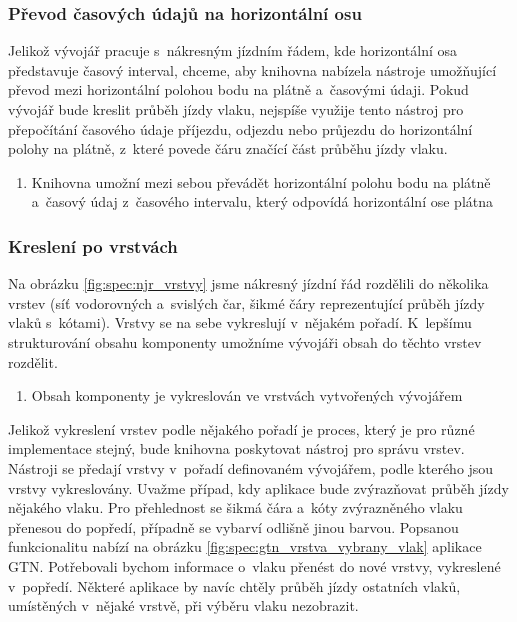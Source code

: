 \subsubsection*{Převod časových údajů na horizontální osu}
Jelikož vývojář pracuje s~nákresným jízdním řádem, kde horizontální osa představuje časový interval, chceme, aby knihovna nabízela nástroje umožňující převod mezi horizontální polohou bodu na plátně a~časovými údaji. Pokud vývojář bude kreslit průběh jízdy vlaku, nejspíše využije tento nástroj pro přepočítání časového údaje příjezdu, odjezdu nebo průjezdu do horizontální polohy na plátně, z~které povede čáru značící část průběhu jízdy vlaku.

\begin{enumerate}[label=\color{reqcolor}\textbf{R{\arabic*}},resume]
	\item \label{spec:req:conv1} Knihovna umožní mezi sebou převádět horizontální polohu bodu na plátně a~časový údaj z~časového intervalu, který odpovídá horizontální ose plátna
\end{enumerate}

\subsubsection*{Kreslení po vrstvách}
\label{kap2:drawing_layers}
Na obrázku \ref{fig:spec:njr_vrstvy} jsme nákresný jízdní řád rozdělili do několika vrstev (síť vodorovných a~svislých čar, šikmé čáry reprezentující průběh jízdy vlaků s~kótami). Vrstvy se na sebe vykreslují v~nějakém pořadí. K~lepšímu strukturování obsahu komponenty umožníme vývojáři obsah do těchto vrstev rozdělit.

\begin{enumerate}[label=\color{reqcolor}\textbf{R{\arabic*}},resume]
	\item \label{spec:req:layers1} Obsah komponenty je vykreslován ve vrstvách vytvořených vývojářem
\end{enumerate}

Jelikož vykreslení vrstev podle nějakého pořadí je proces, který je pro různé implementace stejný, bude knihovna poskytovat nástroj pro správu vrstev. Nástroji se předají vrstvy v~pořadí definovaném vývojářem, podle kterého jsou vrstvy vykreslovány. Uvažme případ, kdy aplikace bude zvýrazňovat průběh jízdy nějakého vlaku. Pro přehlednost se šikmá čára a~kóty zvýrazněného vlaku přenesou do popředí, případně se vybarví odlišně jinou barvou. Popsanou funkcionalitu nabízí na obrázku \ref{fig:spec:gtn_vrstva_vybrany_vlak} aplikace GTN. Potřebovali bychom informace o~vlaku přenést do nové vrstvy, vykreslené v~popředí. Některé aplikace by navíc chtěly průběh jízdy ostatních vlaků, umístěných v~nějaké vrstvě, při výběru vlaku nezobrazit.

